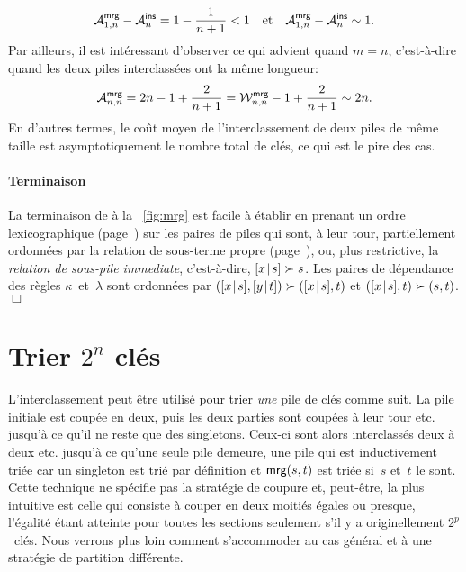 \begin{equation*}
\M{\fun{mrg}}{1,n} - \M{\fun{ins}}{n} = 1 - \frac{1}{n+1} < 1
\quad\text{et}\quad
\M{\fun{mrg}}{1,n} - \M{\fun{ins}}{n} \sim 1.
\end{equation*}
Par ailleurs, il est intéressant d'observer ce qui advient quand \(m =
n\), c'est-à-dire quand les deux piles interclassées ont la même
longueur:
\begin{equation}
  \M{\fun{mrg}}{n,n} = 2n - 1 + \frac{2}{n+1} = \W{\fun{mrg}}{n,n} - 1 +
  \frac{2}{n+1} \sim 2n.\index{mrg@$\M{\fun{mrg}}{n,n}$}
\label{eq:Amrg_n_n}
\end{equation}
En d'autres termes, le coût moyen de l'interclassement de deux piles
de même taille est asymptotiquement le nombre total de clés, ce qui
est le pire des cas.

\paragraph{Terminaison}
\label{merging_termination}

La terminaison de  à la
\fig~\vref{fig:mrg} est facile à établir en prenant un ordre
lexicographique 
(page~\pageref{par:ackermann}) sur les paires de piles qui sont, à
leur tour, partiellement ordonnées par la relation de sous-terme
propre
(page~\pageref{par:well-founded}), ou, plus restrictive, la
\emph{relation de sous-pile immediate}, c'est-à-dire, \(\cons{x}{s} \succ s\). Les
paires de dépendance des règles
\(\kappa\)~et~\(\lambda\) sont ordonnées par
\((\cons{x}{s},\cons{y}{t}) \succ (\cons{x}{s},t)\) et
\((\cons{x}{s},t) \succ (s,t)\).\hfill\(\Box\)

\section{Trier $2^n$ clés}
\label{sec:power_of_two}

L'interclassement peut être utilisé pour trier \emph{une} pile de clés
comme suit. La pile initiale est coupée en deux, puis les deux parties
sont coupées à leur tour etc. jusqu'à ce qu'il ne reste que des
singletons. Ceux-ci sont alors interclassés deux à deux etc. jusqu'à
ce qu'une seule pile demeure, une pile qui est inductivement triée car
un singleton est trié par définition et
\(\fun{mrg}(s,t)\) est triée si~\(s\) et~\(t\)
le sont. Cette technique ne spécifie pas la stratégie de coupure et,
peut-être, la plus intuitive est celle qui consiste à couper en deux
moitiés égales ou presque, l'égalité étant atteinte pour toutes les
sections seulement s'il y a originellement \(2^p\)~clés. Nous verrons
plus loin comment s'accommoder au cas général et à une stratégie de
partition différente.

